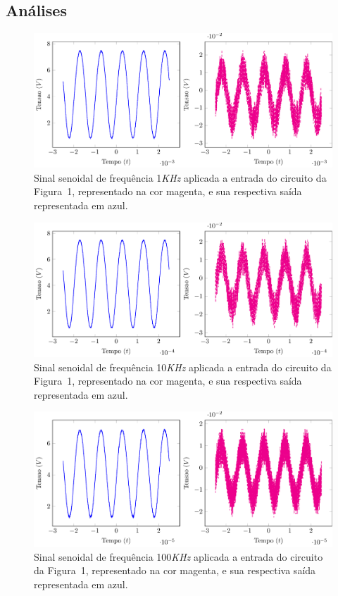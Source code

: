 \documentclass[12pt,a4paper]{article}
\begin{document}
\subsection{Análises}
\begin{figure}[htpb]
  \centering
  \includegraphics[width=0.8\linewidth]{img/scope_1.pdf}
  \caption{Sinal senoidal de frequência 1\emph{KHz} aplicada a entrada do circuito da Figura~1, representado na cor magenta, e sua respectiva saída representada em azul.}
  \label{fig:1khz}
\end{figure}
\begin{figure}[htpb]
  \centering
  \includegraphics[width=0.8\linewidth]{img/scope_2.pdf}
  \caption{Sinal senoidal de frequência 10\emph{KHz} aplicada a entrada do circuito da Figura~1, representado na cor magenta, e sua respectiva saída representada em azul.}
  \label{fig:10khz}
\end{figure}
\begin{figure}[htpb]
  \centering
  \includegraphics[width=0.8\linewidth]{img/scope_5.pdf}
  \caption{Sinal senoidal de frequência 100\emph{KHz} aplicada a entrada do circuito da Figura~1, representado na cor magenta, e sua respectiva saída representada em azul.}
  \label{fig:100khz}
\end{figure}
\end{document}
